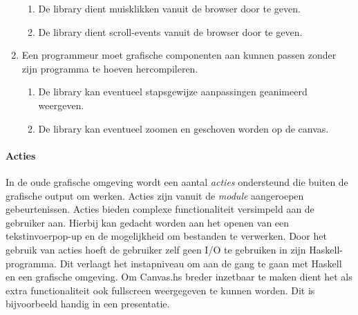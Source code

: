 \begin{enumerate}[label={R\arabic*}]
\begin{enumerate}[label={R\arabic{enumi}.\arabic*}]
		\item \label{req:event:mouse} De library dient muisklikken vanuit de browser door te geven.
		\item \label{req:event:scroll} De library dient scroll-events vanuit de browser door te geven.
	\end{enumerate}
	\item Een programmeur moet grafische componenten aan kunnen passen zonder zijn programma te hoeven hercompileren.
	\begin{enumerate}[label={R\arabic{enumi}.\arabic*}]
		\item \label{req:action:animate} De library kan eventueel stapsgewijze aanpassingen geanimeerd weergeven.
		\item \label{req:zoom} De library kan eventueel zoomen en geschoven worden op de canvas.
	\end{enumerate}
	\setcounter{startvalue}{\value{enumi}}
\end{enumerate}

\paragraph{Acties} In de oude grafische omgeving wordt een aantal \emph{acties} ondersteund die buiten de grafische output om werken. Acties zijn vanuit de \emph{module} aangeroepen gebeurtenissen. Acties bieden complexe functionaliteit versimpeld aan de gebruiker aan. Hierbij kan gedacht worden aan het openen van een tekstinvoerpop-up en de mogelijkheid om bestanden te verwerken. Door het gebruik van acties hoeft de gebruiker zelf geen I/O te gebruiken in zijn Haskell-programma. Dit verlaagt het instapniveau om aan de gang te gaan met Haskell en een grafische omgeving. Om Canvas.hs breder inzetbaar te maken dient het als extra functionaliteit ook fullscreen weergegeven te kunnen worden. Dit is bijvoorbeeld handig in een presentatie.

